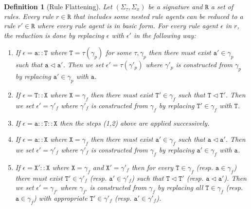 \documentclass[12pt]{article}
\newtheorem{mydef}{Definition}
\begin{document}
\begin{mydef}[Rule Flattening]
Let $(\Sigma_\tau,\Sigma_x)$ be a signature and $\mathtt{R}$ a set of rules. Every rule $r\in\mathtt{R}$ that includes some \emph{nested} rule agents can be reduced to a rule $r'\in\mathtt{R}$ where every rule agent is in \emph{basic} form. For every rule agent $\epsilon$ in $r$, the reduction is done by replacing $\epsilon$ with $\epsilon'$ in the following way:
\begin{enumerate}
\item If $\epsilon=\mathtt{a}::\mathtt{T}$ where $\mathtt{T}=\tau(\gamma_p)$ for some $\tau,\gamma_p$ then there must exist $\mathtt{a}'\in\gamma_p$ such that $\mathtt{a}\lhd\mathtt{a}'$. Then we set $\epsilon'={\tau}(\gamma'_p)$ where $\gamma'_p$ is constructed from $\gamma_p$ by replacing $\mathtt{a}'\in\gamma_p$ with $\mathtt{a}$.
\item If $\epsilon=\mathtt{T}::\mathtt{X}$ where $\mathtt{X}=\gamma_f$ then there must exist $\mathtt{T}'\in\gamma_f$ such that $\mathtt{T}\lhd\mathtt{T}'$. Then we set $\epsilon'=\gamma'_f$ where $\gamma'_f$ is constructed from $\gamma_f$ by replacing $\mathtt{T}'\in\gamma_f$ with $\mathtt{T}$. 
\item If $\epsilon=\mathtt{a}::\mathtt{T}::\mathtt{X}$ then the steps (1,2) above are applied successively.
\item If $\epsilon=\mathtt{a}::\mathtt{X}$ where $\mathtt{X}=\gamma_f$ then there must exist $\mathtt{a}'\in\gamma_f$ such that $\mathtt{a}\lhd\mathtt{a}'$. Then we set $\epsilon'=\gamma'_f$ where $\gamma'_f$ is constructed from $\gamma_f$ by replacing $\mathtt{a}'\in\gamma_f$ with $\mathtt{a}$. 
\item If $\epsilon=\mathtt{X}'::\mathtt{X}$ where $\mathtt{X}=\gamma_f$ and $\mathtt{X}'= \gamma'_f$ then for every $\mathtt{T} \in \gamma_f$ (resp. $\mathtt{a} \in \gamma_f$) there must exist $\mathtt{T}' \in \gamma'_f$ (resp. $\mathtt{a}' \in \gamma'_f$) such that $\mathtt{T} \lhd \mathtt{T}'$ (resp. $\mathtt{a} \lhd \mathtt{a}'$). Then we set $\epsilon'=\gamma_{f'}$ where $\gamma_{f'}$ is constructed from $\gamma_f$ by replacing all $\mathtt{T} \in \gamma_f$ (resp. $\mathtt{a} \in \gamma_f$) with appropriate $\mathtt{T}' \in \gamma'_f$  (resp. $\mathtt{a}' \in \gamma'_f$).
\end{enumerate} 
\end{mydef}
\end{document}
